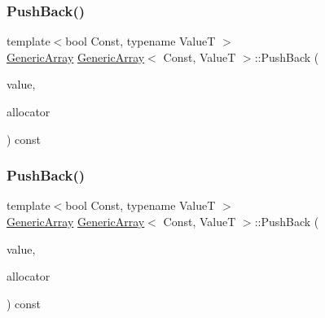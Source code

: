 \mbox{\label{classGenericArray_a2ed88f0630c044bad695a127a866c348}} 
\subsubsection{\texorpdfstring{Push\+Back()}{PushBack()}\hspace{0.1cm}{\footnotesize\ttfamily [1/2]}}
{\footnotesize\ttfamily template$<$bool Const, typename ValueT $>$ \\
\hyperlink{classGenericArray}{Generic\+Array} \hyperlink{classGenericArray}{Generic\+Array}$<$ Const, ValueT $>$\+::Push\+Back (\begin{DoxyParamCaption}\item[{\hyperlink{classGenericArray_a93e53f38a99fc5167eb2a28653de64ed}{Value\+Type} \&}]{value,  }\item[{\hyperlink{classGenericArray_af9cdc12de03c742b9c33dfc172756b97}{Allocator\+Type} \&}]{allocator }\end{DoxyParamCaption}) const\hspace{0.3cm}{\ttfamily [inline]}}

\mbox{\label{classGenericArray_ae599de6aee1167648085672b79dd6bcc}} 
\subsubsection{\texorpdfstring{Push\+Back()}{PushBack()}\hspace{0.1cm}{\footnotesize\ttfamily [2/2]}}
{\footnotesize\ttfamily template$<$bool Const, typename ValueT $>$ \\
\hyperlink{classGenericArray}{Generic\+Array} \hyperlink{classGenericArray}{Generic\+Array}$<$ Const, ValueT $>$\+::Push\+Back (\begin{DoxyParamCaption}\item[{\hyperlink{classGenericArray_a8dcb9e2a2e103ce1051c16a7486465b9}{String\+Ref\+Type}}]{value,  }\item[{\hyperlink{classGenericArray_af9cdc12de03c742b9c33dfc172756b97}{Allocator\+Type} \&}]{allocator }\end{DoxyParamCaption}) const\hspace{0.3cm}{\ttfamily [inline]}}

